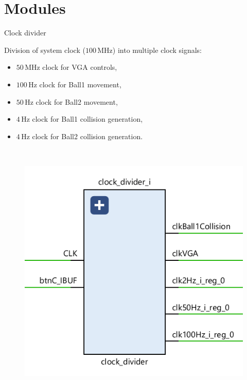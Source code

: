 \documentclass[aspectratio=169, 11pt, hyperref={unicode}]{beamer}
\def\MHz{\,\mathrm{MHz}}
\def\Hz{\,\mathrm{Hz}}
\begin{document}
\section{Modules}
\begin{frame}{Clock divider}
    \begin{minipage}{.45\textwidth}
        Division of system clock ($100\MHz$) into multiple clock signals:
        \begin{itemize}
            \item $50\MHz$ clock for VGA controls,
            \item $100\Hz$ clock for Ball1 movement,
            \item $50\Hz$ clock for Ball2 movement,
            \item $4\Hz$ clock for Ball1 collision generation,
            \item $4\Hz$ clock for Ball2 collision generation.
        \end{itemize}
    \end{minipage}
    ~
    \begin{minipage}{.45\textwidth}
        \begin{figure}[!ht]
            \centering
            \includegraphics[width=\textwidth]{src/clock-divider.png}
        \end{figure}
    \end{minipage}
\end{frame}
\end{document}
